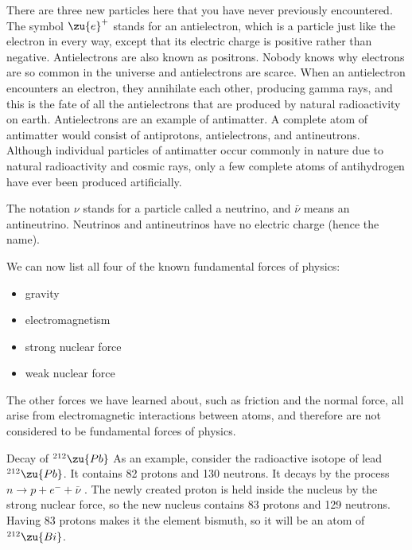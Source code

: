         There are three new particles here that you have never
        previously encountered. The symbol $\zu{e}^+$ stands for an
        antielectron, which is a particle just like the electron in
        every way, except that its electric charge is positive
        rather than negative. Antielectrons are also known as
        positrons. Nobody knows why electrons are so common in the
        universe and antielectrons are scarce. When an antielectron
        encounters an electron, they annihilate each other, producing gamma rays, and this
        is the fate of all the antielectrons that are produced by
        natural radioactivity on earth.
        Antielectrons are an example of antimatter. A complete atom of antimatter
        would consist of antiprotons, antielectrons, and antineutrons. Although
        individual particles of antimatter occur commonly in nature due to natural
        radioactivity and cosmic rays, only a few complete atoms of antihydrogen have
        ever been produced artificially.

        The notation $\nu $ stands for a particle called a neutrino,
        and $\bar{\nu}$ means an antineutrino.  Neutrinos and antineutrinos
        have no electric charge (hence the name). 

        We can now list all four of the known fundamental forces of physics:

        \begin{itemize}
        \item gravity

        \item electromagnetism

        \item strong nuclear force

        \item weak nuclear force
        \end{itemize}

        The other forces we have learned about, such as friction and
        the normal force, all arise from electromagnetic interactions
        between atoms, and therefore are not considered to be
        fundamental forces of physics.

\begin{eg}{Decay of $^{212}\zu{Pb}$}
        As an example, consider the radioactive isotope of lead
        $^{212}\zu{Pb}$. It contains 82 protons and 130 neutrons. It
        decays by the process $n\rightarrow p + e^- + \bar{\nu}$ . The newly
        created proton is held inside the nucleus by the strong
        nuclear force, so the new nucleus contains 83 protons and
        129 neutrons. Having 83 protons makes it the element
        bismuth, so it will be an atom of $^{212}\zu{Bi}$.
\end{eg}

